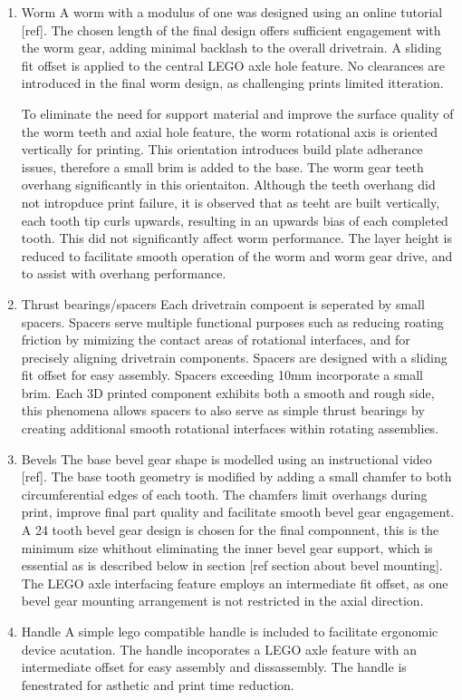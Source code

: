 \documentclass[11pt]{article}
\begin{document}
\begin{enumerate}
\item Worm
\label{sec:orgeb250ab}
A worm with a modulus of one was designed using an online tutorial [ref]. The chosen length of the final design offers sufficient engagement with the worm gear, adding minimal backlash to the overall drivetrain. A sliding fit offset is applied to the central LEGO axle hole feature. No clearances are introduced in the final worm design, as challenging prints limited itteration. 

To eliminate the need for support material and improve the surface quality of the worm teeth and axial hole feature, the worm rotational axis is oriented vertically for printing. This orientation introduces build plate adherance issues, therefore a small brim is added to the base. The worm gear teeth overhang significantly in this orientaiton. Although the teeth overhang did not intropduce print failure, it is observed that as teeht are built vertically, each tooth tip curls upwards, resulting in an upwards bias of each completed tooth. This did not significantly affect worm performance. The layer height is reduced to facilitate smooth operation of the worm and worm gear drive, and to assist with overhang performance.

\item Thrust bearings/spacers
\label{sec:org76254bb}
Each drivetrain compoent is seperated by small spacers. Spacers serve multiple functional purposes such as reducing roating friction by mimizing the contact areas of rotational interfaces, and for precisely aligning drivetrain components. Spacers are designed with a sliding fit offset for easy assembly. Spacers exceeding 10mm incorporate a small brim. Each 3D printed component exhibits both a smooth and rough side, this phenomena allows spacers to also serve as simple thrust bearings by creating additional smooth rotational interfaces within rotating assemblies.

\item Bevels
\label{sec:org6ae96ba}
The base bevel gear shape is modelled using an instructional video [ref]. The base tooth geometry is modified by adding a small chamfer to both circumferential edges of each tooth. The chamfers limit overhangs during print, improve final part quality and facilitate smooth bevel gear engagement. A 24 tooth bevel gear design is chosen for the final componnent, this is the minimum size whithout eliminating the inner bevel gear support, which is essential as is described below in section [ref section about bevel mounting]. The LEGO axle interfacing feature employs an intermediate fit offset, as one bevel gear mounting arrangement is not restricted in the axial direction. 

\item Handle
\label{sec:org29d4d43}
A simple lego compatible handle is included to facilitate ergonomic device acutation. The handle incoporates a LEGO axle feature with an intermediate offset for easy assembly and dissassembly. The handle is fenestrated for asthetic and print time reduction.
\end{enumerate}
\end{document}
